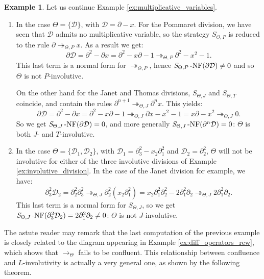 \documentclass[10pt]{easychair}
\theoremstyle{definition}
\newtheorem{example}[theorem]{Example}
\newcommand\D{\mathcal{D}}
\newcommand\rewTheta{\to_\Theta}
\newcommand\rewThetaS[1]{\twoheadrightarrow_{\Theta,#1}}
\newcommand{\SThetaNF}[1]{{\it S}_{\Theta,#1}\operatorname{-NF}}
\begin{document}
\begin{example}
Let us continue Example \ref{ex:multiplicative_variables}.
\begin{enumerate}
\item In the case $\Theta = \{ \D \}$, with $\D = \partial - x$. For the Pommaret division,
  we have seen that $\D$ admits no multiplicative variable, so the strategy
  $S_{\Theta,P}$ is reduced to the rule $\partial \rewThetaS{P} x$. As a result we get:
  \[
    \partial \D = \partial^2 - \partial x = \partial^2 - x \partial - 1 \rewThetaS{P} \partial^2 - x^2 - 1.
  \]
  This last term is a normal form for $\rewThetaS{P}$, hence
  $\SThetaNF{P}(\partial\D) \neq 0$ and so $\Theta$ is not $P$-involutive.

  
  On the other hand for the Janet and Thomas divisions, $S_{\Theta,J}$ and
  $S_{\Theta,T}$ coincide, and contain the rules
  $\partial^{n+1} \rewThetaS{J} \partial^n x$. This yields:
  \[
    \partial\D = \partial^2 - \partial x = \partial^2 - x \partial - 1 \rewThetaS{J} \partial x  - x^2 -1 = x \partial - x^2 \rewThetaS{J} 0.
  \]
  So we get $\SThetaNF{J}(\partial\D) = 0$, and more generally
  $\SThetaNF{J}(\partial^n\D) = 0$: $\Theta$ is both  $J$- and $T$-involutive.
  
\item In the case $\Theta = \{ \D_1 , \D_2 \}$, with
  $\D_1 = \partial_3^2 - x_2 \partial_1^2$ and $\D_2 = \partial_2^2$, $\Theta$ will not be involutive for
  either of the three involutive divisions of Example
  \ref{ex:involutive_division}. In the case of the Janet division for example, we have:
  \[
    \partial_3^2 \D_2 = \partial_2^2 \partial_3^2
    \rewThetaS{J} \partial_2^2 (x_2 \partial_1^2) =
    x_2 \partial_1^2 \partial_2^2 - 2 \partial_1^2 \partial_2
    \rewThetaS{J} 2 \partial_1^2 \partial_2.
  \]
  This last term is a normal form for $S_{\Theta,J}$, so we get
  $\SThetaNF{J}(\partial_3^2 \D_2) = 2 \partial_1^2 \partial_2
  \neq 0$: $\Theta$ is not $J$-involutive. 
\end{enumerate}
\end{example}

The astute reader may remark that the last computation of the previous example
is closely related to the diagram appearing in Example
\ref{ex:diff_operators_rew}, which shows that $\rewTheta$ fails to be
confluent. This relationship between confluence and $L$-involutivity is actually
a very general one, as shown by the following theorem.

\medskip
\end{document}
